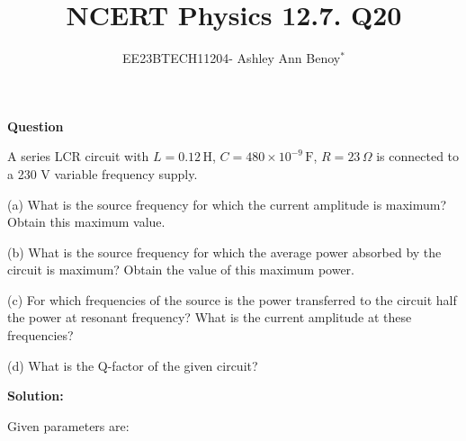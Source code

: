 \documentclass[journal,12pt,twocolumn]{IEEEtran}
\theoremstyle{remark}
\begin{document}

\vspace{3cm}

\title{NCERT Physics 12.7. Q20}
\author{EE23BTECH11204- Ashley Ann Benoy$^{*}$%
}
\maketitle
\newpage
\bigskip



\textbf{Question}

A series LCR circuit with 
\(L = 0.12 \, \text{H}\),
\(C = 480 \times 10^{-9} \, \text{F}\), 
\(R=23 \, \Omega\)
is connected to a 230 V variable frequency supply.

(a) What is the source frequency for which the current amplitude is maximum? Obtain this maximum value.

(b) What is the source frequency for which the average power absorbed by the circuit is maximum? Obtain the value of this maximum power.

(c) For which frequencies of the source is the power transferred to the circuit half the power at resonant frequency? What is the current amplitude at these frequencies?

(d) What is the Q-factor of the given circuit?

\textbf{Solution:}

Given parameters are:



\end{document}
